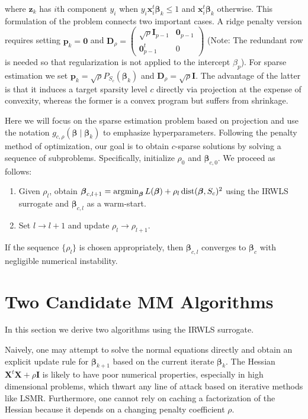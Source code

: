 \documentclass[11pt]{article}
\def\dist{\mathop{\rm dist}\nolimits}
\def\argmin{\mathop{\rm argmin}\nolimits}
\newcommand{\bzero}{\boldsymbol{0}}
\newcommand{\bp}{\boldsymbol{p}}
\newcommand{\bx}{\boldsymbol{x}}
\newcommand{\bz}{\boldsymbol{z}}
\newcommand{\bD}{\boldsymbol{D}}
\newcommand{\bI}{\boldsymbol{I}}
\newcommand{\bX}{\boldsymbol{X}}
\newcommand{\bbeta}{\boldsymbol{\beta}}
\begin{document}
where $\bz_k$ has $i$th component $y_i$ when $y_i \bx_i^t\bbeta_k \le 1$
and $\bx_i^t\bbeta_k$ otherwise. 
This formulation of the problem connects two important cases.
A ridge penalty version requires setting $\bp_{k} = \bzero$ and $\bD_{\rho} = \begin{pmatrix} \sqrt{\rho} \bI_{p-1} & \bzero_{p-1} \\ \bzero_{p-1}^{t} & 0 \end{pmatrix}$ (Note: The redundant row is needed so that regularization is not applied to the intercept $\beta_{p}$).
For sparse estimation we set $\bp_k = \sqrt{\rho} P_{S_{c}}(\bbeta_k)$ and $\bD_{\rho} = \sqrt{\rho} \bI$.
The advantage of the latter is that it induces a target sparsity level $c$ directly via projection at the expense of convexity, whereas the former is a convex program but suffers from shrinkage.

Here we will focus on the sparse estimation problem based on projection and use the notation $g_{c,\rho}(\bbeta \mid \bbeta_{k})$ to emphasize hyperparameters.
Following the penalty method of optimization, our goal is to obtain $c$-sparse solutions by solving a sequence of subproblems.
Specifically, initialize $\rho_{0}$ and $\bbeta_{c,0}$.
We proceed as follows:
\begin{enumerate}
    \item Given $\rho_{l}$, obtain $\bbeta_{c,l+1} = \argmin_{\bbeta} L(\bbeta) + \rho_{l} \dist(\bbeta, S_{c})^{2}$ using the IRWLS surrogate and $\bbeta_{c,l}$ as a warm-start.
    \item Set $l \to l + 1$ and update $\rho_{l} \to \rho_{l+1}$.
\end{enumerate}
If the sequence $\{\rho_{l}\}$ is chosen appropriately, then $\bbeta_{c,l}$ converges to $\bbeta_{c}$ with negligible numerical instability.

\section*{\center Two Candidate MM Algorithms}
In this section we derive two algorithms using the IRWLS surrogate.

Naively, one may attempt to solve the normal equations directly and obtain an explicit update rule for $\bbeta_{k+1}$ based on the current iterate $\bbeta_{k}$.
The Hessian $\bX^{t} \bX + \rho \bI$ is likely to have poor numerical properties, especially in high dimensional problems, which thwart any line of attack based on iterative methods like LSMR.
Furthermore, one cannot rely on caching a factorization of the Hessian because it depends on a changing penalty coefficient $\rho$.
\end{document}
